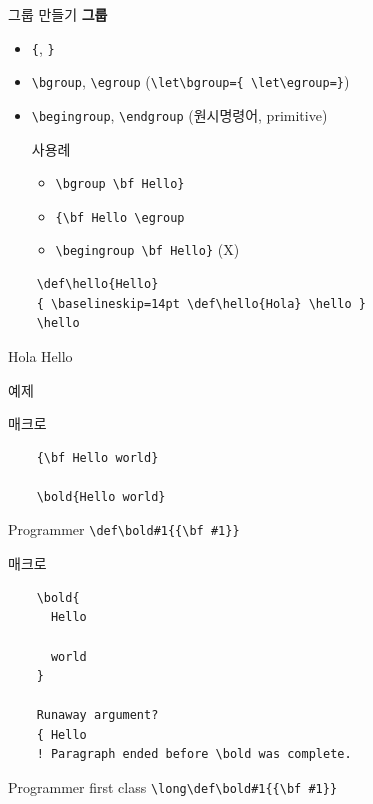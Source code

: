 \documentclass{beamer}
\begin{document}
%
\begin{frame}[fragile]{그룹 만들기}
  \textbf{\alert{그룹}}
  \begin{itemize}
  \item \verb+{+, \verb+}+
  \item \verb+\bgroup+, \verb+\egroup+
    ({\small \verb+\let\bgroup={ \let\egroup=}+})
  \item \verb+\begingroup+, \verb+\endgroup+ (원시명령어, primitive)
    \begin{alertblock}{사용례}
      \begin{itemize}
      \item \verb+\bgroup \bf Hello}+
      \item \verb+{\bf Hello \egroup+
      \item \verb+\begingroup \bf Hello}+ (X)
      \end{itemize}
    \end{alertblock}
  \end{itemize}
  {\small
\begin{verbatim}
    \def\hello{Hello}
    { \baselineskip=14pt \def\hello{Hola} \hello }
    \hello
\end{verbatim}}

  Hola Hello
\end{frame}


%
\begin{frame}[standout]
  예제
\end{frame}


%
\begin{frame}[fragile]{\texttt{\string\bold} 매크로}
\begin{verbatim}
    {\bf Hello world}
    
    \bold{Hello world}
\end{verbatim}
  \begin{alertblock}{Programmer}
    \verb+\def\bold#1{{\bf #1}}+
  \end{alertblock}
\end{frame}


%
\begin{frame}[fragile]{\texttt{\string\bold} 매크로}
\begin{verbatim}
    \bold{
      Hello

      world
    }

    Runaway argument?
    { Hello
    ! Paragraph ended before \bold was complete.
\end{verbatim}
  \begin{alertblock}{Programmer first class}
    \verb+\long\def\bold#1{{\bf #1}}+
  \end{alertblock}
\end{frame}
\end{document}
